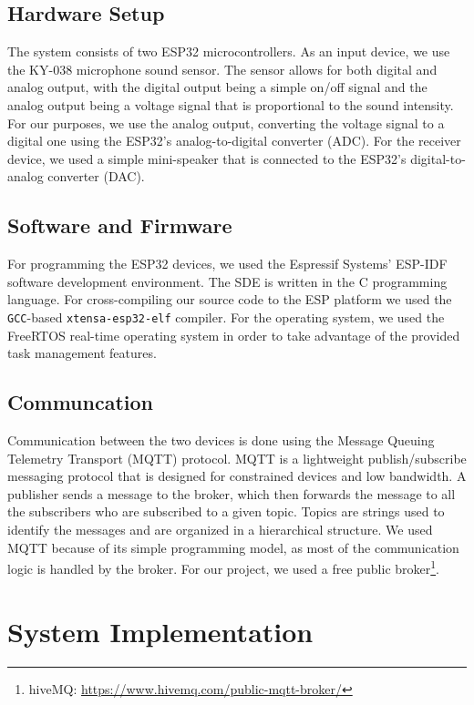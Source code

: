 \documentclass[conference]{IEEEtran}
\begin{document}
\subsection{Hardware Setup}
The system consists of two ESP32\cite{ESP32_Manual} microcontrollers.
As an input device, we use the KY-038\cite{KY-038} microphone sound sensor.
The sensor allows for both digital and analog output, with the digital output being a simple
on/off signal and the analog output being a voltage signal that is proportional to the sound intensity.
For our purposes, we use the analog output, converting the voltage signal to a digital one using the
ESP32's analog-to-digital converter (ADC).
For the receiver device, we used a simple mini-speaker that is connected to the ESP32's digital-to-analog converter (DAC).

\subsection{Software and Firmware}

For programming the ESP32 devices, we used the Espressif Systems' ESP-IDF\cite{ESP-IDF}
software development environment. The SDE is written in the C programming 
language. For cross-compiling our source code to the ESP platform we used the \texttt{GCC}-based
\texttt{xtensa-esp32-elf} compiler. 
For the operating system, we used the FreeRTOS\cite{FreeRTOS} real-time operating system
in order to take advantage of the provided task management features.
\subsection{Communcation}

Communication between the two devices is done using the Message Queuing Telemetry Transport (MQTT) protocol\cite{MQTT_Survey}.
MQTT is a lightweight publish/subscribe messaging protocol that is designed for constrained devices and low bandwidth.
A publisher sends a message to the broker, which then forwards the message to all the subscribers who are subscribed to a given topic.
Topics are strings used to identify the messages and are organized in a hierarchical structure.
We used MQTT because of its simple programming model, as most of the communication logic is handled by the broker.
For our project, we used a free public broker\footnote{hiveMQ: \url{https://www.hivemq.com/public-mqtt-broker/}}.


\section{System Implementation}
\label{sec:system_implementation}
\end{document}
